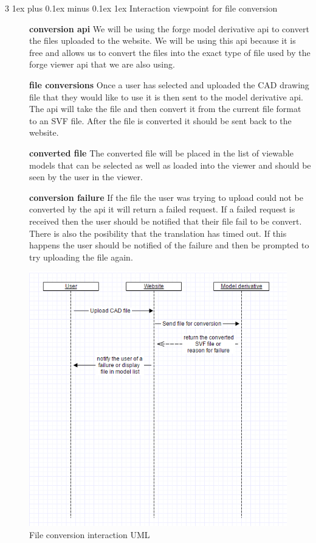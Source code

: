 \documentclass[letterpaper, 10pt, draftclsnofoot, compsoc, onecolumn]{IEEEtran}
\makeatletter
\def\subsubsection{\@startsection{subsubsection}%
                                 {3}%
                                 {\z@}%
                                 {1ex plus 0.1ex minus 0.1ex}%
                                 {1ex}%
                                 {\normalfont\normalsize}}%
\makeatother
\begin{document}
\subsubsection{Interaction viewpoint for file conversion}
\begin{description}
	\item[]\textbf{conversion api} We will be using the forge model derivative api to convert the files uploaded to the website. We will be using this api because it is free and allows us to convert the files into the exact type of file used by the forge viewer api that we are also using. 
	\item[]\textbf{file conversions} Once a user has selected and uploaded the CAD drawing file that they would like to use it is then sent to the model derivative api. The api will take the file and then convert it from the current file format to an SVF file. After the file is converted it should be sent back to the website.
	\item[]\textbf{converted file} The converted file will be placed in the list of viewable models that can be selected as well as loaded into the viewer and should be seen by the user in the viewer.
	\item[]\textbf{conversion failure} If the file the user was trying to upload could not be converted by the api it will return a failed request. If a failed request is received then the user should be notified that their file fail to be convert. There is also the posibility that the translation has timed out. If this happens the user should be notified of the failure and then be prompted to try uploading the file again.
\end{description}

\begin{figure}
	\includegraphics[scale=0.7]{conversionUML.png}
	\caption{File conversion interaction UML}
\end{figure}




\end{document}
